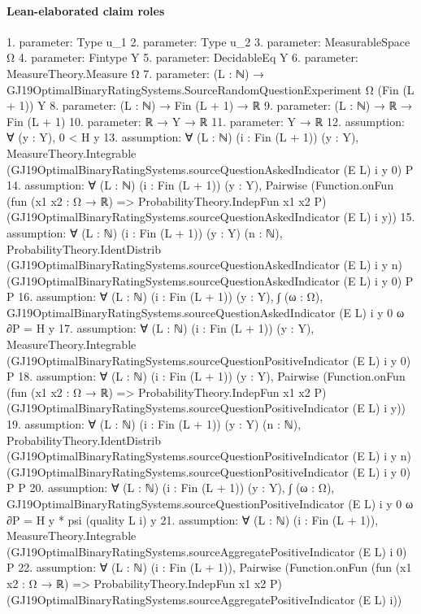 \documentclass[10pt]{article}
\begin{document}
\paragraph{Lean-elaborated claim roles}\begin{ReviewVerbatim}
1. parameter: Type u_1
2. parameter: Type u_2
3. parameter: MeasurableSpace Ω
4. parameter: Fintype Y
5. parameter: DecidableEq Y
6. parameter: MeasureTheory.Measure Ω
7. parameter: (L : ℕ) → GJ19OptimalBinaryRatingSystems.SourceRandomQuestionExperiment Ω (Fin (L + 1)) Y
8. parameter: (L : ℕ) → Fin (L + 1) → ℝ
9. parameter: (L : ℕ) → ℝ → Fin (L + 1)
10. parameter: ℝ → Y → ℝ
11. parameter: Y → ℝ
12. assumption: ∀ (y : Y), 0 < H y
13. assumption: ∀ (L : ℕ) (i : Fin (L + 1)) (y : Y),
  MeasureTheory.Integrable (GJ19OptimalBinaryRatingSystems.sourceQuestionAskedIndicator (E L) i y 0) P
14. assumption: ∀ (L : ℕ) (i : Fin (L + 1)) (y : Y),
  Pairwise
    (Function.onFun (fun (x1 x2 : Ω → ℝ) => ProbabilityTheory.IndepFun x1 x2 P)
      (GJ19OptimalBinaryRatingSystems.sourceQuestionAskedIndicator (E L) i y))
15. assumption: ∀ (L : ℕ) (i : Fin (L + 1)) (y : Y) (n : ℕ),
  ProbabilityTheory.IdentDistrib (GJ19OptimalBinaryRatingSystems.sourceQuestionAskedIndicator (E L) i y n)
    (GJ19OptimalBinaryRatingSystems.sourceQuestionAskedIndicator (E L) i y 0) P P
16. assumption: ∀ (L : ℕ) (i : Fin (L + 1)) (y : Y),
  ∫ (ω : Ω), GJ19OptimalBinaryRatingSystems.sourceQuestionAskedIndicator (E L) i y 0 ω ∂P = H y
17. assumption: ∀ (L : ℕ) (i : Fin (L + 1)) (y : Y),
  MeasureTheory.Integrable (GJ19OptimalBinaryRatingSystems.sourceQuestionPositiveIndicator (E L) i y 0) P
18. assumption: ∀ (L : ℕ) (i : Fin (L + 1)) (y : Y),
  Pairwise
    (Function.onFun (fun (x1 x2 : Ω → ℝ) => ProbabilityTheory.IndepFun x1 x2 P)
      (GJ19OptimalBinaryRatingSystems.sourceQuestionPositiveIndicator (E L) i y))
19. assumption: ∀ (L : ℕ) (i : Fin (L + 1)) (y : Y) (n : ℕ),
  ProbabilityTheory.IdentDistrib (GJ19OptimalBinaryRatingSystems.sourceQuestionPositiveIndicator (E L) i y n)
    (GJ19OptimalBinaryRatingSystems.sourceQuestionPositiveIndicator (E L) i y 0) P P
20. assumption: ∀ (L : ℕ) (i : Fin (L + 1)) (y : Y),
  ∫ (ω : Ω), GJ19OptimalBinaryRatingSystems.sourceQuestionPositiveIndicator (E L) i y 0 ω ∂P = H y * psi (quality L i) y
21. assumption: ∀ (L : ℕ) (i : Fin (L + 1)),
  MeasureTheory.Integrable (GJ19OptimalBinaryRatingSystems.sourceAggregatePositiveIndicator (E L) i 0) P
22. assumption: ∀ (L : ℕ) (i : Fin (L + 1)),
  Pairwise
    (Function.onFun (fun (x1 x2 : Ω → ℝ) => ProbabilityTheory.IndepFun x1 x2 P)
      (GJ19OptimalBinaryRatingSystems.sourceAggregatePositiveIndicator (E L) i))

\end{ReviewVerbatim}
\end{document}

